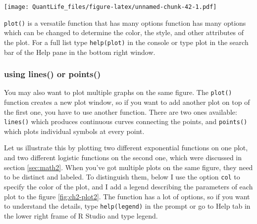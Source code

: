 \documentclass[
]{book}
\begin{document}
\texttt{[image: QuantLife\_files/figure-latex/unnamed-chunk-42-1.pdf]}

\texttt{plot()} is a versatile function that has many options function has many options which can be changed to determine the color, the style, and other attributes of the plot. For a full list type \texttt{help(plot)} in the console or type plot in the search bar of the Help pane in the bottom right window.

\hypertarget{using-lines-or-points}{%
\subsubsection{using lines() or points()}\label{using-lines-or-points}}

You may also want to plot multiple graphs on the same figure. The \texttt{plot()} function creates a new plot window, so if you want to add another plot on top of the first one, you have to use another function. There are two ones available: \texttt{lines()} which produces continuous curves connecting the points, and \texttt{points()} which plots individual symbols at every point.

Let us illustrate this by plotting two different exponential functions on one plot, and two different logistic functions on the second one, which were discussed in section \ref{sec:math2}. When you've got multiple plots on the same figure, they need to be distinct and labeled. To distinguish them, below I use the option \texttt{col} to specify the color of the plot, and I add a legend describing the parameters of each plot to the figure \ref{fig:ch2-plot2}. The function has a lot of options, so if you want to understand the details, type \texttt{help(legend)} in the prompt or go to Help tab in the lower right frame of R Studio and type legend.
\end{document}
